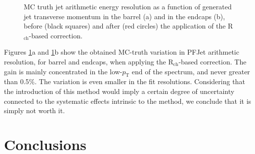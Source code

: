 \documentclass{cmspaper}
\begin{document}
\begin{figure}[tb]
\centering
{} \hspace{0.6cm}
\caption{MC truth jet arithmetic energy resolution as a function of generated jet transverse momentum in the barrel (a) and in the endcaps (b), before (black squares) and after (red circles) the application of the R$_{\mathrm{ch}}$-based correction. \label{fig:resolution}}
\end{figure}


Figures \ref{fig:resolution}a and \ref{fig:resolution}b show the obtained MC-truth variation in PFJet arithmetic resolution, for barrel and endcaps, when applying the R$_{\mathrm{ch}}$-based correction. The gain is mainly concentrated in the low-$p_{\mathrm{T}}$ end of the spectrum, and never greater than 0.5\%. The variation is even smaller in the fit resolutions. Considering that the introduction of this method would imply a certain degree of uncertainty connected to the systematic effects intrinsic to the method, we conclude that it is simply not worth it.
 
 


\section{Conclusions}
\end{document}
